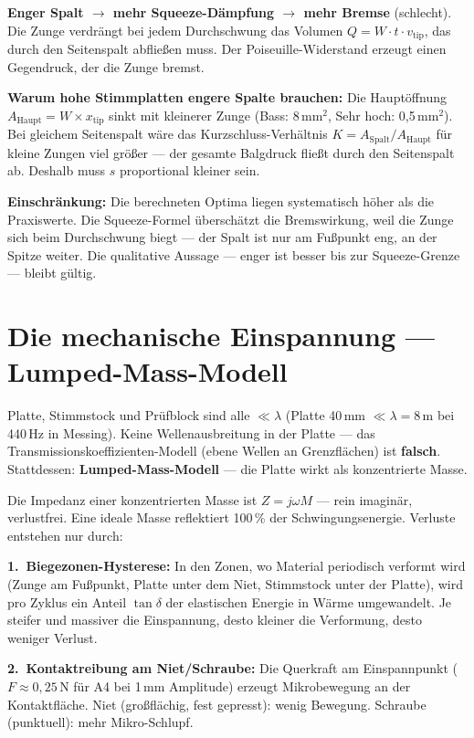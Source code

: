 \documentclass[11pt,a4paper]{article}
\begin{document}
\textbf{Enger Spalt $\to$ mehr Squeeze-Dämpfung $\to$ mehr Bremse} (schlecht). Die Zunge verdrängt bei jedem Durchschwung das Volumen $Q = W \cdot t \cdot v_\text{tip}$, das durch den Seitenspalt abfließen muss. Der Poiseuille-Widerstand erzeugt einen Gegendruck, der die Zunge bremst.

\textbf{Warum hohe Stimmplatten engere Spalte brauchen:} Die Hauptöffnung $A_\text{Haupt} = W \times x_\text{tip}$ sinkt mit kleinerer Zunge (Bass: 8\,mm$^2$, Sehr hoch: 0,5\,mm$^2$). Bei gleichem Seitenspalt wäre das Kurzschluss-Verhältnis $K = A_\text{Spalt}/A_\text{Haupt}$ für kleine Zungen viel größer --- der gesamte Balgdruck fließt durch den Seitenspalt ab. Deshalb muss $s$ proportional kleiner sein.

\begin{warnbox}
\textbf{Einschränkung:} Die berechneten Optima liegen systematisch höher als die Praxiswerte. Die Squeeze-Formel überschätzt die Bremswirkung, weil die Zunge sich beim Durchschwung biegt --- der Spalt ist nur am Fußpunkt eng, an der Spitze weiter. Die qualitative Aussage --- enger ist besser bis zur Squeeze-Grenze --- bleibt gültig.
\end{warnbox}

\section{Die mechanische Einspannung --- Lumped-Mass-Modell}

Platte, Stimmstock und Prüfblock sind alle $\ll \lambda$ (Platte 40\,mm $\ll \lambda = 8$\,m bei 440\,Hz in Messing). Keine Wellenausbreitung in der Platte --- das Transmissionskoeffizienten-Modell (ebene Wellen an Grenzflächen) ist \textbf{falsch}. Stattdessen: \textbf{Lumped-Mass-Modell} --- die Platte wirkt als konzentrierte Masse.

Die Impedanz einer konzentrierten Masse ist $Z = j\omega M$ --- rein imaginär, verlustfrei. Eine ideale Masse reflektiert 100\,\% der Schwingungsenergie. Verluste entstehen nur durch:

\textbf{1.\ Biegezonen-Hysterese:} In den Zonen, wo Material periodisch verformt wird (Zunge am Fußpunkt, Platte unter dem Niet, Stimmstock unter der Platte), wird pro Zyklus ein Anteil $\tan\delta$ der elastischen Energie in Wärme umgewandelt. Je steifer und massiver die Einspannung, desto kleiner die Verformung, desto weniger Verlust.

\textbf{2.\ Kontaktreibung am Niet/Schraube:} Die Querkraft am Einspannpunkt ($F \approx 0{,}25$\,N für A4 bei 1\,mm Amplitude) erzeugt Mikrobewegung an der Kontaktfläche. Niet (großflächig, fest gepresst): wenig Bewegung. Schraube (punktuell): mehr Mikro-Schlupf.
\end{document}
